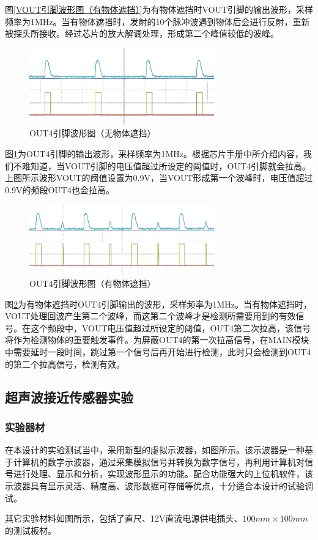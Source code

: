  图\ref{VOUT引脚波形图（有物体遮挡）}为有物体遮挡时VOUT引脚的输出波形，采样频率为1MHz。当有物体遮挡时，发射的10个脉冲波遇到物体后会进行反射，重新被探头所接收。经过芯片的放大解调处理，形成第二个峰值较低的波峰。
 \begin{figure}[ht]
	    \centering
	    \includegraphics[width=8cm]{figure/debug waveform7.png}
	    \caption{OUT4引脚波形图（无物体遮挡）}
	    \label{OUT4引脚波形图（无物体遮挡）}
	\end{figure}
 图\ref{OUT4引脚波形图（无物体遮挡）}为OUT4引脚的输出波形，采样频率为1MHz。根据芯片手册中所介绍内容，我们不难知道，当VOUT引脚的电压值超过所设定的阈值时，OUT4引脚就会拉高。上图所示波形VOUT的阈值设置为0.9V，当VOUT形成第一个波峰时，电压值超过0.9V的频段OUT4也会拉高。
 \begin{figure}[ht]
	    \centering
	    \includegraphics[width=8cm]{figure/debug wave form8.png}
	    \caption{OUT4引脚波形图（有物体遮挡）}
	    \label{OUT4引脚波形图（有物体遮挡）}
	\end{figure}
 图\ref{OUT4引脚波形图（有物体遮挡）}为有物体遮挡时OUT4引脚输出的波形，采样频率为1MHz。当有物体遮挡时，VOUT处理回波产生第二个波峰，而这第二个波峰才是检测所需要用到的有效信号。在这个频段中，VOUT电压值超过所设定的阈值，OUT4第二次拉高，该信号将作为检测物体的重要触发事件。为屏蔽OUT4的第一次拉高信号，在MAIN模块中需要延时一段时间，跳过第一个信号后再开始进行检测，此时只会检测到OUT4的第二个拉高信号，检测有效。

 

\subsection{超声波接近传感器实验}

\subsubsection{实验器材}
在本设计的实验测试当中，采用新型的虚拟示波器，如图所示。该示波器是一种基于计算机的数字示波器，通过采集模拟信号并转换为数字信号，再利用计算机对信号进行处理、显示和分析，实现波形显示的功能。配合功能强大的上位机软件，该示波器具有显示灵活、精度高、波形数据可存储等优点，十分适合本设计的试验调试。\par
其它实验材料如图所示，包括了直尺、12V直流电源供电插头、$100mm\times100mm$的测试板材。

